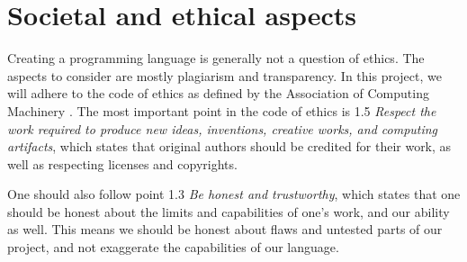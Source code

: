 \documentclass[12pt,a4paper]{article}
\begin{document}
\section{Societal and ethical aspects}
Creating a programming language is generally not a question of ethics.
The aspects to consider are mostly plagiarism and transparency. In this project, we will adhere to the code of ethics as
defined by the Association of Computing Machinery \cite{ACM}. The most important point in the code of ethics is 1.5
\emph {Respect the work required to produce new ideas, inventions, creative works, and computing artifacts}, which states that
original authors should be credited for their work, as well as respecting licenses and copyrights.

One should also follow point 1.3 \emph{Be honest and trustworthy}, which states that one should be honest about the limits and
capabilities of one's work, and our ability as well. This means we should be honest about flaws and untested parts of our
project, and not exaggerate the capabilities of our language.
\end{document}
